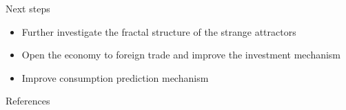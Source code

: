 \documentclass{beamer}
\begin{document}
\begin{frame}{Next steps}
	\begin{itemize}
		\item Further investigate the fractal structure of the strange attractors
		\item Open the economy to foreign trade and improve the investment mechanism 
		\item Improve consumption prediction mechanism
	\end{itemize}
\end{frame}

\begin{frame}[allowframebreaks]{References}
	\nocite{*}
	\printbibliography
\end{frame}
\end{document}
